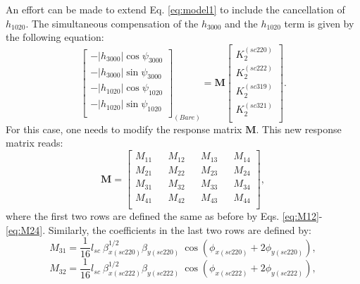 An effort can be made to extend Eq. \ref{eq:model1} to include the cancellation of $h_{1020}$. The simultaneous compensation of the $h_{3000}$ and the $h_{1020}$ term is given by the following equation:
\begin{equation}
    \begin{bmatrix}
        -|h_{3000}| \cos \psi_{3000} \\
        -|h_{3000}| \sin \psi_{3000} \\
        -|h_{1020}| \cos \psi_{1020} \\
        -|h_{1020}| \sin \psi_{1020} \\
        \end{bmatrix}_{(Bare)}
         =
        \boldsymbol{M}
        \begin{bmatrix}
        K_2^{(sc220)} \\
        K_2^{(sc222)}\\
        K_2^{(sc319)} \\
        K_2^{(sc321)}\\
        \end{bmatrix}.
        \label{eq:model2}
\end{equation}
For this case, one needs to modify the response matrix $\boldsymbol{M}$. This new response matrix reads:
\begin{equation}
    \boldsymbol{M} = 
\begin{bmatrix}

M_{11} && M_{12} && M_{13} && M_{14}  \\ 

M_{21} && M_{22} && M_{23} && M_{24} \\ 

M_{31} && M_{32} && M_{33} && M_{34}  \\ 

M_{41} && M_{42} && M_{43} && M_{44} \\ 

\end{bmatrix},
\label{eq:rm2}
\end{equation}
where the first two rows are defined the same as before by Eqs. \ref{eq:M12}-\ref{eq:M24}. Similarly, the coefficients in the last two rows are defined by:
\begin{equation}
    M_{31}=\frac{1}{16} l_{sc} \: \beta^{1/2}_{x(sc220)} \beta_{y(sc220)} \: \cos \left( \phi_{x(sc220)} + 2\phi_{y(sc220)} \right),
    \label{eq:M31}
\end{equation}
\begin{equation}
    M_{32}=\frac{1}{16} l_{sc} \: \beta^{1/2}_{x(sc222)} \beta_{y(sc222)} \: \cos \left( \phi_{x(sc222)} + 2\phi_{y(sc222)} \right),
    \label{eq:M32}
\end{equation}
